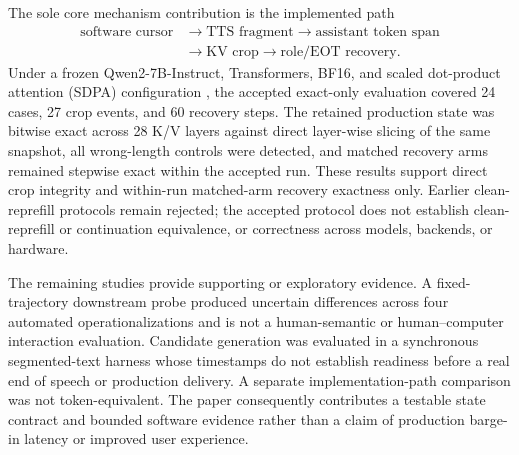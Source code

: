 The sole core mechanism contribution is the implemented path
\begin{equation}
\begin{split}
\text{software cursor}&\rightarrow\text{TTS fragment}\rightarrow
\text{assistant token span}\\
&\rightarrow\text{KV crop}\rightarrow\text{role/EOT recovery}.
\end{split}
\label{eq:contribution-path}
\end{equation}
Under a frozen Qwen2-7B-Instruct, Transformers, BF16, and scaled dot-product attention (SDPA) configuration \citep{yang2024Qwen2}, the accepted exact-only evaluation covered 24 cases, 27 crop events, and 60 recovery steps. The retained production state was bitwise exact across 28 K/V layers against direct layer-wise slicing of the same snapshot, all wrong-length controls were detected, and matched recovery arms remained stepwise exact within the accepted run. These results support direct crop integrity and within-run matched-arm recovery exactness only. Earlier clean-reprefill protocols remain rejected; the accepted protocol does not establish clean-reprefill or continuation equivalence, or correctness across models, backends, or hardware.

The remaining studies provide supporting or exploratory evidence. A fixed-trajectory downstream probe produced uncertain differences across four automated operationalizations and is not a human-semantic or human--computer interaction evaluation. Candidate generation was evaluated in a synchronous segmented-text harness whose timestamps do not establish readiness before a real end of speech or production delivery. A separate implementation-path comparison was not token-equivalent. The paper consequently contributes a testable state contract and bounded software evidence rather than a claim of production barge-in latency or improved user experience.
